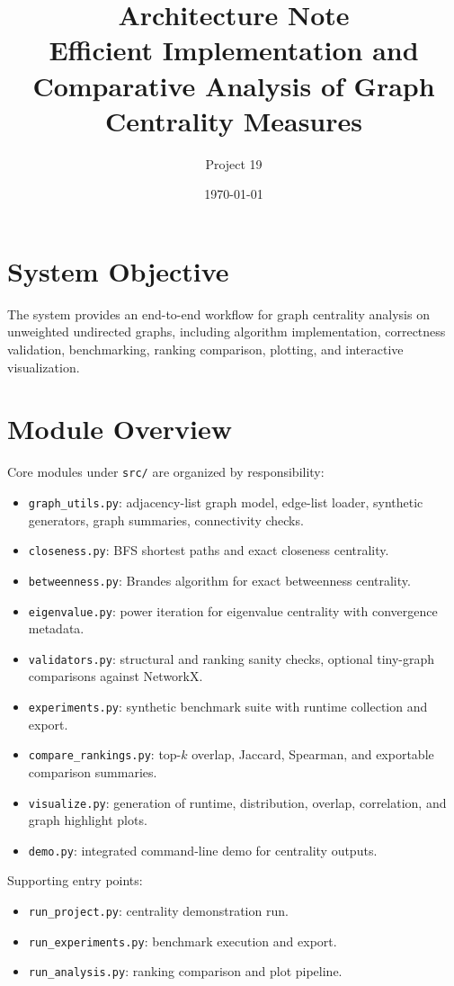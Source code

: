 \documentclass[11pt]{article}
\title{Architecture Note\\Efficient Implementation and Comparative Analysis of Graph Centrality Measures}
\author{Project 19}
\date{\today}
\begin{document}
\maketitle

\section{System Objective}
The system provides an end-to-end workflow for graph centrality analysis on unweighted undirected graphs, including algorithm implementation, correctness validation, benchmarking, ranking comparison, plotting, and interactive visualization.

\section{Module Overview}
Core modules under \texttt{src/} are organized by responsibility:
\begin{itemize}[leftmargin=*]
    \item \texttt{graph\_utils.py}: adjacency-list graph model, edge-list loader, synthetic generators, graph summaries, connectivity checks.
    \item \texttt{closeness.py}: BFS shortest paths and exact closeness centrality.
    \item \texttt{betweenness.py}: Brandes algorithm for exact betweenness centrality.
    \item \texttt{eigenvalue.py}: power iteration for eigenvalue centrality with convergence metadata.
    \item \texttt{validators.py}: structural and ranking sanity checks, optional tiny-graph comparisons against NetworkX.
    \item \texttt{experiments.py}: synthetic benchmark suite with runtime collection and export.
    \item \texttt{compare\_rankings.py}: top-$k$ overlap, Jaccard, Spearman, and exportable comparison summaries.
    \item \texttt{visualize.py}: generation of runtime, distribution, overlap, correlation, and graph highlight plots.
    \item \texttt{demo.py}: integrated command-line demo for centrality outputs.
\end{itemize}

Supporting entry points:
\begin{itemize}[leftmargin=*]
    \item \texttt{run\_project.py}: centrality demonstration run.
    \item \texttt{run\_experiments.py}: benchmark execution and export.
    \item \texttt{run\_analysis.py}: ranking comparison and plot pipeline.
\end{itemize}
\end{document}
